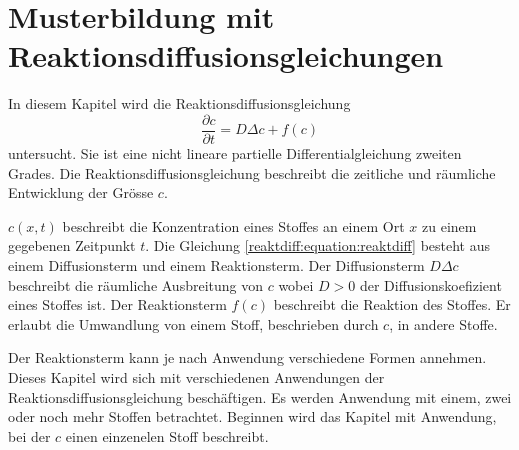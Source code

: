%
%
%
%
\chapter{Musterbildung mit Reaktionsdiffusionsgleichungen\label{chapter:reaktdiff}}
\begin{refsection}

In diesem Kapitel wird die Reaktionsdiffusionsgleichung
\begin{equation}
\label{reaktdiff:equation:reaktdiff}
\frac{\partial c}{\partial t} = D \Delta c + f(c)
\end{equation}
untersucht.
Sie ist eine nicht lineare partielle Differentialgleichung zweiten Grades.
Die Reaktionsdiffusionsgleichung beschreibt die zeitliche und räumliche Entwicklung der Grösse \(c\).

\(c(x,t)\) beschreibt die Konzentration eines Stoffes an einem Ort \(x\) zu einem gegebenen Zeitpunkt \(t\).
Die Gleichung \eqref{reaktdiff:equation:reaktdiff} besteht aus einem Diffusionsterm und einem Reaktionsterm.
Der Diffusionsterm \(D \Delta c\) beschreibt die räumliche Ausbreitung von \(c\) wobei \(D > 0\) der Diffusionskoefizient eines Stoffes ist.
Der Reaktionsterm \(f(c)\) beschreibt die Reaktion des Stoffes.
Er erlaubt die Umwandlung von einem Stoff, beschrieben durch \(c\), in andere Stoffe.

Der Reaktionsterm kann je nach Anwendung verschiedene Formen annehmen.
Dieses Kapitel wird sich mit verschiedenen Anwendungen der Reaktionsdiffusionsgleichung beschäftigen.
Es werden Anwendung mit einem, zwei oder noch mehr Stoffen betrachtet.
Beginnen wird das Kapitel mit Anwendung, bei der \(c\) einen einzenelen Stoff beschreibt.







\printbibliography[heading=subbibliography]
\end{refsection}
